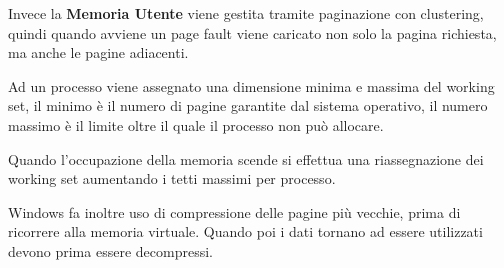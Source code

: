 \spacer
Invece la \textbf{Memoria Utente} viene gestita tramite paginazione con clustering, quindi quando avviene un page fault viene caricato non solo la pagina richiesta, ma anche le pagine adiacenti.

Ad un processo viene assegnato una dimensione minima e massima del working set, il minimo è il numero di pagine garantite dal sistema operativo, il numero massimo è il limite oltre il quale il processo non può allocare.

Quando l'occupazione della memoria scende si effettua una riassegnazione dei working set aumentando i tetti massimi per processo.

\spacer
Windows fa inoltre uso di compressione delle pagine più vecchie, prima di ricorrere alla memoria virtuale. Quando poi i dati tornano ad essere utilizzati devono prima essere decompressi.
